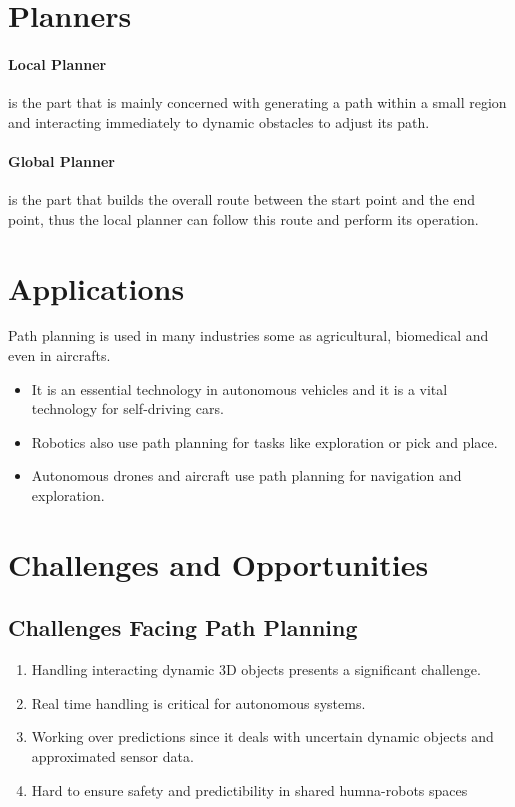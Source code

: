 \documentclass{article}
\begin{document}
\section{Planners}
\paragraph{Local Planner}
is the part that is mainly concerned with generating a path within a small region and interacting immediately to dynamic obstacles to adjust its path.
\paragraph{Global Planner}
is the part that builds the overall route between the start point and the end point, thus the local planner can follow this route and perform its operation.
\section{Applications}
Path planning is used in many industries some as agricultural, biomedical and even in aircrafts.
\begin{itemize}
	\item
It is an essential technology in autonomous vehicles and it is a vital technology for self-driving cars.
	\item
Robotics also use path planning for tasks like exploration or pick and place.
	\item
Autonomous drones and aircraft use path planning for navigation and exploration.
\end{itemize}
\section{Challenges and Opportunities}
\subsection{Challenges Facing Path Planning}
\begin{enumerate}
	\item 
Handling interacting dynamic 3D objects presents a significant challenge.
	\item
Real time handling is critical for autonomous systems.
	\item
Working over predictions since it deals with uncertain dynamic objects and approximated sensor data.
	\item
Hard to ensure safety and predictibility in shared humna-robots spaces
\end{enumerate}
\end{document}
